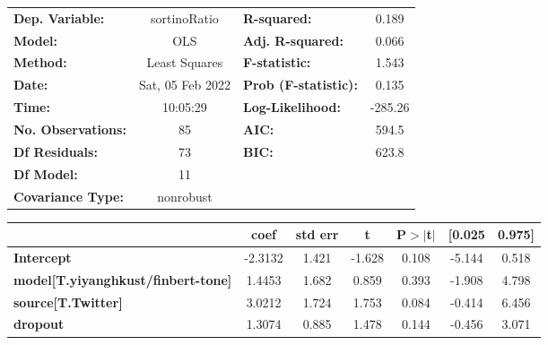 \begin{center}
\begin{tabular}{lclc}
\toprule
\textbf{Dep. Variable:}                    &   sortinoRatio   & \textbf{  R-squared:         } &     0.189   \\
\textbf{Model:}                            &       OLS        & \textbf{  Adj. R-squared:    } &     0.066   \\
\textbf{Method:}                           &  Least Squares   & \textbf{  F-statistic:       } &     1.543   \\
\textbf{Date:}                             & Sat, 05 Feb 2022 & \textbf{  Prob (F-statistic):} &    0.135    \\
\textbf{Time:}                             &     10:05:29     & \textbf{  Log-Likelihood:    } &   -285.26   \\
\textbf{No. Observations:}                 &          85      & \textbf{  AIC:               } &     594.5   \\
\textbf{Df Residuals:}                     &          73      & \textbf{  BIC:               } &     623.8   \\
\textbf{Df Model:}                         &          11      & \textbf{                     } &             \\
\textbf{Covariance Type:}                  &    nonrobust     & \textbf{                     } &             \\
\bottomrule
\end{tabular}
\begin{tabular}{lcccccc}
                                           & \textbf{coef} & \textbf{std err} & \textbf{t} & \textbf{P$> |$t$|$} & \textbf{[0.025} & \textbf{0.975]}  \\
\midrule
\textbf{Intercept}                         &      -2.3132  &        1.421     &    -1.628  &         0.108        &       -5.144    &        0.518     \\
\textbf{model[T.yiyanghkust/finbert-tone]} &       1.4453  &        1.682     &     0.859  &         0.393        &       -1.908    &        4.798     \\
\textbf{source[T.Twitter]}                 &       3.0212  &        1.724     &     1.753  &         0.084        &       -0.414    &        6.456     \\
\textbf{dropout}                           &       1.3074  &        0.885     &     1.478  &         0.144        &       -0.456    &        3.071     \\

\end{tabular}
\end{center}
